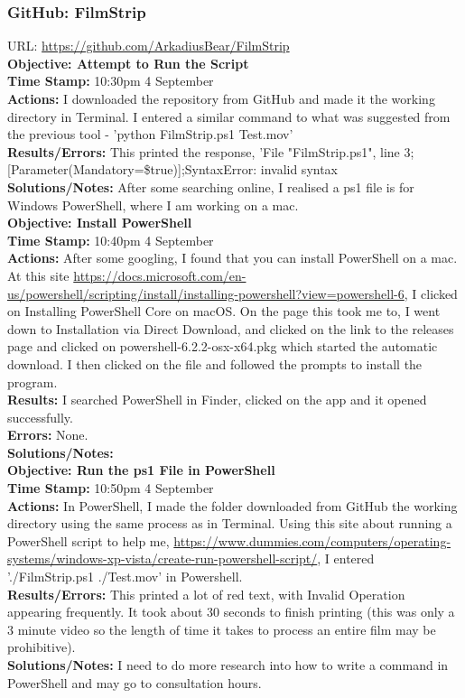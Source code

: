 \documentclass{article}
\begin{document}
\subsubsection{GitHub: FilmStrip}
URL: \url{https://github.com/ArkadiusBear/FilmStrip}\\

\textbf{Objective: Attempt to Run the Script}\\
\textbf{Time Stamp:} 10:30pm 4 September\\
\textbf{Actions:} I downloaded the repository from GitHub and made it the working directory in Terminal. I entered a similar command to what was suggested from the previous tool - 'python FilmStrip.ps1 Test.mov'\\
\textbf{Results/Errors:} This printed the response, 'File "FilmStrip.ps1", line 3; [Parameter(Mandatory=\$true)];SyntaxError: invalid syntax\\
\textbf{Solutions/Notes:} After some searching online, I realised a ps1 file is for Windows PowerShell, where I am working on a mac.\\

\textbf{Objective: Install PowerShell}\\
\textbf{Time Stamp:} 10:40pm 4 September\\
\textbf{Actions:} After some googling, I found that you can install PowerShell on a mac. At this site \url{https://docs.microsoft.com/en-us/powershell/scripting/install/installing-powershell?view=powershell-6}, I clicked on Installing PowerShell Core on macOS. On the page this took me to, I went down to Installation via Direct Download, and clicked on the link to the releases page and clicked on powershell-6.2.2-osx-x64.pkg which started the automatic download. I then clicked on the file and followed the prompts to install the program.\\
\textbf{Results:} I searched PowerShell in Finder, clicked on the app and it opened successfully.\\
\textbf{Errors:} None.\\
\textbf{Solutions/Notes:} \\

\textbf{Objective: Run the ps1 File in PowerShell}\\
\textbf{Time Stamp:} 10:50pm 4 September\\
\textbf{Actions:} In PowerShell, I made the folder downloaded from GitHub the working directory using the same process as in Terminal. Using this site about running a PowerShell script to help me, \url{https://www.dummies.com/computers/operating-systems/windows-xp-vista/create-run-powershell-script/}, I entered './FilmStrip.ps1 ./Test.mov' in Powershell. \\
\textbf{Results/Errors:} This printed a lot of red text, with Invalid Operation appearing frequently. It took about 30 seconds to finish printing (this was only a 3 minute video so the length of time it takes to process an entire film may be prohibitive).\\
\textbf{Solutions/Notes:} I need to do more research into how to write a command in PowerShell and may go to consultation hours.\\
\end{document}
